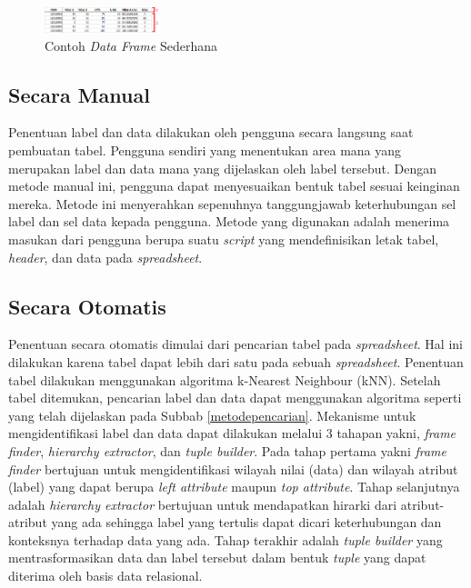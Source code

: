 \begin{figure}[htb]
    \centering
    \includegraphics[width=0.3\textwidth]{resources/chapter-3-simple-dataframe2.png}
    \caption{Contoh \textit{Data Frame} Sederhana}
	\label{DataFrameSederhana}
\end{figure}

	\subsection{Secara Manual}
	Penentuan label dan data dilakukan oleh pengguna secara langsung saat pembuatan tabel. Pengguna sendiri yang menentukan area mana yang merupakan label dan data mana yang dijelaskan oleh label tersebut. Dengan metode manual ini, pengguna dapat menyesuaikan bentuk tabel sesuai keinginan mereka. Metode ini menyerahkan sepenuhnya tanggungjawab keterhubungan sel label dan sel data kepada pengguna. Metode yang digunakan adalah menerima masukan dari pengguna berupa suatu \textit{script} yang mendefinisikan letak tabel, \textit{header}, dan data pada \textit{spreadsheet}.

	\subsection{Secara Otomatis}
	Penentuan secara otomatis dimulai dari pencarian tabel pada \textit{spreadsheet}. Hal ini dilakukan karena tabel dapat lebih dari satu pada sebuah \textit{spreadsheet}. Penentuan tabel dilakukan menggunakan algoritma k-Nearest Neighbour (kNN). Setelah tabel ditemukan, pencarian label dan data dapat menggunakan algoritma seperti yang telah dijelaskan pada Subbab \ref{metodepencarian}. Mekanisme untuk mengidentifikasi label dan data dapat dilakukan melalui 3 tahapan yakni, \textit{frame finder}, \textit{hierarchy extractor}, dan \textit{tuple builder}. Pada tahap pertama yakni \textit{frame finder} bertujuan untuk mengidentifikasi wilayah nilai (data) dan wilayah atribut (label) yang dapat berupa \textit{left attribute} maupun \textit{top attribute}. Tahap selanjutnya adalah \textit{hierarchy extractor} bertujuan untuk mendapatkan hirarki dari atribut-atribut yang ada sehingga label yang tertulis dapat dicari keterhubungan dan konteksnya terhadap data yang ada. Tahap terakhir adalah \textit{tuple builder} yang mentrasformasikan data dan label tersebut dalam bentuk \textit{tuple} yang dapat diterima oleh basis data relasional.


